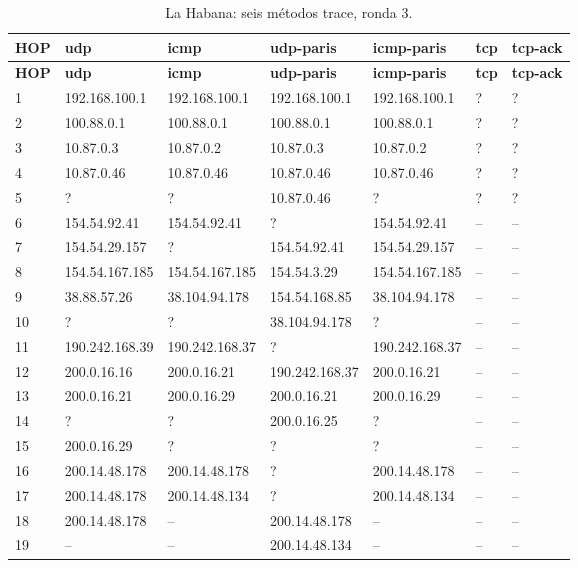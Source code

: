 \begin{landscape}
\begingroup
\fontsize{9}{11}\selectfont
\begin{longtable}{p{0.95cm}p{3.725cm}p{3.725cm}p{3.725cm}p{3.725cm}p{3.725cm}p{3.725cm}}
\caption{La Habana: seis métodos trace, ronda 3.}\label{anexo:trace:200.14.48.134:3} \\
\toprule
\textbf{HOP} & \textbf{udp} & \textbf{icmp} & \textbf{udp-paris} & \textbf{icmp-paris} & \textbf{tcp} & \textbf{tcp-ack} \\ \midrule
\endfirsthead
\toprule
\textbf{HOP} & \textbf{udp} & \textbf{icmp} & \textbf{udp-paris} & \textbf{icmp-paris} & \textbf{tcp} & \textbf{tcp-ack} \\ \midrule
\endhead
1 & 192.168.100.1 & 192.168.100.1 & 192.168.100.1 & 192.168.100.1 & ? & ? \\
2 & 100.88.0.1 & 100.88.0.1 & 100.88.0.1 & 100.88.0.1 & ? & ? \\
3 & 10.87.0.3 & 10.87.0.2 & 10.87.0.3 & 10.87.0.2 & ? & ? \\
4 & 10.87.0.46 & 10.87.0.46 & 10.87.0.46 & 10.87.0.46 & ? & ? \\
5 & ? & ? & 10.87.0.46 & ? & ? & ? \\
6 & 154.54.92.41 & 154.54.92.41 & ? & 154.54.92.41 & -- & -- \\
7 & 154.54.29.157 & ? & 154.54.92.41 & 154.54.29.157 & -- & -- \\
8 & 154.54.167.185 & 154.54.167.185 & 154.54.3.29 & 154.54.167.185 & -- & -- \\
9 & 38.88.57.26 & 38.104.94.178 & 154.54.168.85 & 38.104.94.178 & -- & -- \\
10 & ? & ? & 38.104.94.178 & ? & -- & -- \\
11 & 190.242.168.39 & 190.242.168.37 & ? & 190.242.168.37 & -- & -- \\
12 & 200.0.16.16 & 200.0.16.21 & 190.242.168.37 & 200.0.16.21 & -- & -- \\
13 & 200.0.16.21 & 200.0.16.29 & 200.0.16.21 & 200.0.16.29 & -- & -- \\
14 & ? & ? & 200.0.16.25 & ? & -- & -- \\
15 & 200.0.16.29 & ? & ? & ? & -- & -- \\
16 & 200.14.48.178 & 200.14.48.178 & ? & 200.14.48.178 & -- & -- \\
17 & 200.14.48.178 & 200.14.48.134 & ? & 200.14.48.134 & -- & -- \\
18 & 200.14.48.178 & -- & 200.14.48.178 & -- & -- & -- \\
19 & -- & -- & 200.14.48.134 & -- & -- & -- \\
\bottomrule
\end{longtable}
\endgroup
\end{landscape}
